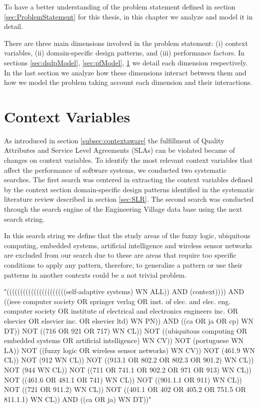 To have a better understanding of the problem statement defined in section \ref{sec:ProblemStatement} for this thesis, in this chapter we analyze and model it in detail.

There are three main dimensions involved in the problem statement: (i) context variables, (ii) domain-specific design patterns, and (iii) performance factors. In sections \ref{sec:dsdpModel}, \ref{sec:pfModel}, \ref{sec:contextVariablesSearch} we detail each dimension respectively. In the last section we analyze how these dimensions interact between them and how we model the problem taking account each dimension and their interactions.

\section{Context Variables}
\label{sec:contextVariablesSearch}

As introduced in section \ref{subsec:contextaware} the fulfillment of Quality Attributes and Service Level Agreements (SLAs) can be violated became of changes on context variables. To identify the most relevant context variables that affect the performance of software systems, we conducted two systematic searches. The first search was centered in extracting the context variables defined by the context section domain-specific design patterns identified in the systematic literature review described in section \ref{sec:SLR}. The second search was conducted through the search engine of the Engineering Village data base using the next search string.

In this search string we define that the study areas of the fuzzy logic, ubiquitous computing, embedded systems, artificial intelligence and wireless sensor networks are excluded from our search due to these are areas that require too specific conditions to apply any pattern, therefore, to generalize a pattern or use their patterns in another contexts could be a not trivial problem.  \newline

"((((((((((((((((((((((self-adaptive systems) WN ALL)) AND (context)))) AND (({ieee computer society} OR {springer verlag} OR {inst. of elec. and elec. eng. computer society} OR {institute of electrical and electronics engineers inc.} OR {elsevier} OR {elsevier inc.} OR {elsevier ltd}) WN PN)) AND (({ca} OR {ja} OR {cp}) WN DT)) NOT (({716} OR {921} OR {717}) WN CL)) NOT (({ubiquitous computing} OR {embedded systems} OR {artificial intelligence}) WN CV)) NOT ({portuguese} WN LA)) NOT (({fuzzy logic} OR {wireless sensor networks}) WN CV)) NOT ({461.9} WN CL)) NOT ({912} WN CL)) NOT (({913.1} OR {802.2} OR {802.3} OR {901.2}) WN CL)) NOT ({944} WN CL)) NOT (({711} OR {741.1} OR {902.2} OR {971} OR {913}) WN CL)) NOT (({461.6} OR {481.1} OR {741}) WN CL)) NOT (({901.1.1} OR {911}) WN CL)) NOT (({721} OR {911.2}) WN CL)) NOT (({401.1} OR {402} OR {405.2} OR {751.5} OR {811.1.1}) WN CL)) AND (({ca} OR {ja}) WN DT))" \newline

